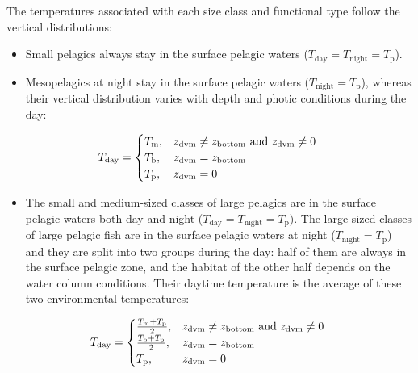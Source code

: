 \documentclass[
]{article}
\providecommand{\tightlist}{%
  \setlength{\itemsep}{0pt}\setlength{\parskip}{0pt}}
\begin{document}
The temperatures associated with each size class and functional type
follow the vertical distributions:

\begin{itemize}
\item
  Small pelagics always stay in the surface pelagic waters
  (\(T_{\mathrm{day}}=T_{\mathrm{night}}=T_{\mathrm{p}}\)).
\item
  Mesopelagics at night stay in the surface pelagic waters
  (\(T_{\mathrm{night}}=T_{\mathrm{p}}\)), whereas their vertical
  distribution varies with depth and photic conditions during the day:
\end{itemize}

\begin{equation}
 T_{\mathrm{day}} =
  \begin{cases}
     T_{\mathrm{m}}, & \text{$ z_{\mathrm{dvm}} \neq z_{\mathrm{bottom}} $ and $ z_{\mathrm{dvm}} \neq 0 $ } \\
     T_{\mathrm{b}}, & \text{$ z_{\mathrm{dvm}} = z_{\mathrm{bottom}} $} \\
     T_{\mathrm{p}}, & \text{$ z_{\mathrm{dvm}} = 0 $}      
  \end{cases}
\label{eq:xxxxxxxx}
\end{equation}

\begin{itemize}
\tightlist
\item
  The small and medium-sized classes of large pelagics are in the
  surface pelagic waters both day and night
  (\(T_{\mathrm{day}}=T_{\mathrm{night}}=T_{\mathrm{p}}\)). The
  large-sized classes of large pelagic fish are in the surface pelagic
  waters at night (\(T_{\mathrm{night}}=T_{\mathrm{p}}\)) and they are
  split into two groups during the day: half of them are always in the
  surface pelagic zone, and the habitat of the other half depends on the
  water column conditions. Their daytime temperature is the average of
  these two environmental temperatures:
\end{itemize}

\begin{equation}
 T_{\mathrm{day}} =
  \begin{cases}
     \frac{T_{\mathrm{m}}+T_{\mathrm{p}}}{2}, & \text{$ z_{\mathrm{dvm}} \neq z_{\mathrm{bottom}} $ and $ z_{\mathrm{dvm}} \neq 0 $ } \\
     \frac{T_{\mathrm{b}}+T_{\mathrm{p}}}{2}, & \text{$ z_{\mathrm{dvm}} = z_{\mathrm{bottom}} $} \\
     T_{\mathrm{p}}, & \text{$ z_{\mathrm{dvm}} = 0 $}      
  \end{cases}
\label{eq:xxxxxxx}
\end{equation}
\end{document}
